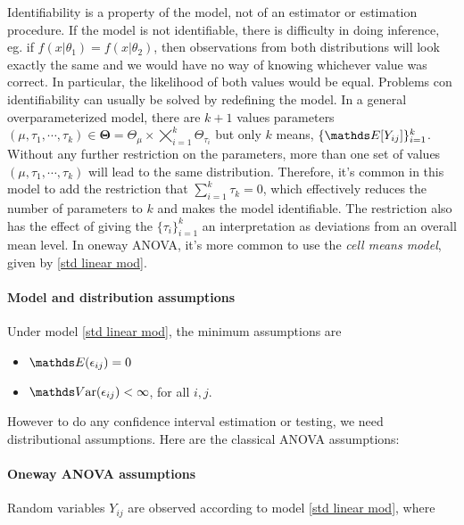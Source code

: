 \documentclass{homework}
\begin{document}
Identifiability is a property of the model, not of an estimator or estimation procedure. If the model is not identifiable, there is difficulty in doing inference, eg. if $f(x|\theta_1) = f(x|\theta_2)$, then observations from both distributions will look exactly the same and we would have no way of knowing whichever value was correct. In particular, the likelihood of both values would be equal. Problems con identifiability can usually be solved by redefining the model. In a general overparameterized model, there are $k+1$ values parameters $(\mu, \tau_{1}, \cdots, \tau_k) \in \bm{\Theta} = \Theta_{\mu} \times \bigtimes\limits_{i=1}^k \Theta_{\tau_{i}}$ but only $k$ means, $\{\E[Y_{ij}]\}_{i=1}^{k}$. Without any further restriction on the parameters, more than one set of values $(\mu, \tau_{1}, \cdots, \tau_k)$ will lead to the same distribution. Therefore, it's common in this model to add the restriction that $\sum_{i=1}^{k} \tau_k = 0$, which effectively reduces the number of parameters to $k$ and makes the model identifiable. The restriction also has the effect of giving the $\{\tau_i\}_{i=1}^k$ an interpretation as deviations from an overall mean level. In oneway ANOVA, it's more common to use the \textit{cell means model}, given by \eqref{std linear mod}. \\

\paragraph{\textbf{Model and distribution assumptions}}

Under model \eqref{std linear mod}, the minimum assumptions are

\begin{itemize}
    \item $\E (\epsilon_{ij}) = 0$
    \item $\var (\epsilon_{ij}) < \infty$, for all $i,j$. 
\end{itemize}

However to do any confidence interval estimation or testing, we need distributional assumptions. Here are the classical ANOVA assumptions: \\

\paragraph{\textbf{Oneway ANOVA assumptions}}

Random variables $Y_{ij}$ are observed according to model \eqref{std linear mod}, where
\end{document}
